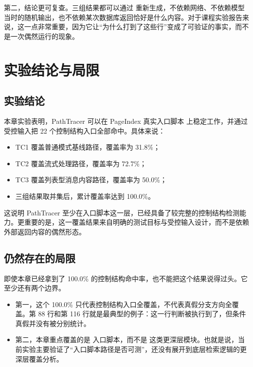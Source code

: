 第二，结论更可复查。三组结果都可以通过  重新生成，不依赖网络、不依赖模型当时的随机输出，也不依赖某次数据库返回恰好是什么内容。对于课程实验报告来说，这一点非常重要，因为它让“为什么打到了这些行”变成了可验证的事实，而不是一次偶然运行的现象。

\section{实验结论与局限}

\subsection{实验结论}

本章实验表明，PathTracer 可以在 PageIndex 真实入口脚本  上稳定工作，并通过受控输入把 22 个控制结构入口全部命中。具体来说：

\begin{itemize}
    \item TC1 覆盖普通模式基线路径，覆盖率为 31.8\%；
    \item TC2 覆盖流式处理路径，覆盖率为 72.7\%；
    \item TC3 覆盖列表型消息内容路径，覆盖率为 50.0\%；
    \item 三组结果取并集后，累计覆盖率达到 100.0\%。
\end{itemize}

这说明 PathTracer 至少在入口脚本这一层，已经具备了较完整的控制结构检测能力。更重要的是，这一覆盖结果来自明确的测试目标与受控输入设计，而不是依赖外部返回内容的偶然形态。

\subsection{仍然存在的局限}

即使本章已经拿到了 100.0\% 的控制结构命中率，也不能把这个结果说得过头。它至少还有两个边界。

\begin{itemize}
    \item 第一，这个 100.0\% 只代表控制结构入口全覆盖，不代表真假分支方向全覆盖。第 88 行和第 116 行就是最典型的例子：这一行判断被执行到了，但条件真假并没有被分别统计。
    \item 第二，本章重点覆盖的是  入口脚本，而不是  这类更深层模块。也就是说，当前实验主要验证了“入口脚本路径是否可测”，还没有展开到底层检索逻辑的更深层覆盖分析。
\end{itemize}

